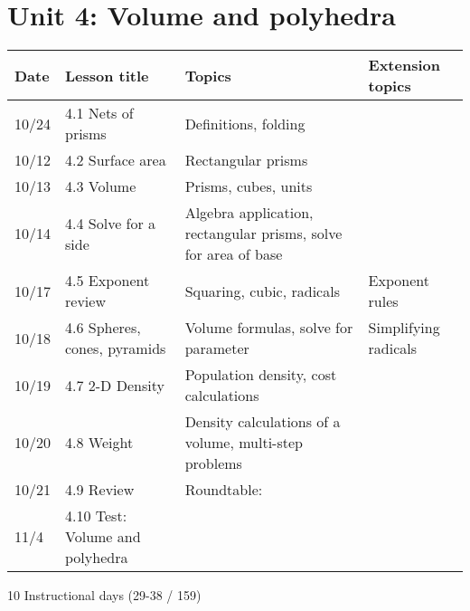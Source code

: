 \section*{Unit 4: Volume and polyhedra}
\begin{tabular}{|p{0.9cm}|p{4cm}|p{7cm}|p{5cm}|}
  \hline
  Date & Lesson title & Topics  & Extension topics \\
  \hline
  10/24 & 4.1 Nets of prisms & Definitions, folding &  \\
  \hline
  10/12 & 4.2 Surface area & Rectangular prisms &  \\
  \hline
  10/13 & 4.3 Volume & Prisms, cubes, units &  \\
  \hline
  10/14 & 4.4 Solve for a side & Algebra application, rectangular prisms, solve for area of base &  \\
  \hline
  10/17 & 4.5 Exponent review & Squaring, cubic, radicals & Exponent rules \\
  \hline
  10/18 & 4.6 Spheres, cones, pyramids & Volume formulas, solve for parameter & Simplifying radicals \\
  \hline
  10/19 & 4.7 2-D Density & Population density, cost calculations &  \\
  \hline
  10/20 & 4.8 Weight & Density calculations of a volume, multi-step problems & \\
  \hline
  10/21 & 4.9 Review & Roundtable: &  \\
  \hline
  11/4 & 4.10 Test: Volume and polyhedra &  &  \\
  \hline

\end{tabular} \par \vspace*{0.3cm}
10 Instructional days (29-38 / 159)


